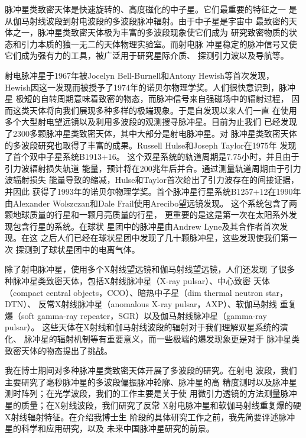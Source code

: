 

脉冲星类致密天体是快速旋转的、高度磁化的中子星。它们最重要的特征之一
是从伽马射线波段到射电波段的多波段脉冲辐射。由于中子星是宇宙中
最致密的天体之一，脉冲星类致密天体极为丰富的多波段现象使它们成为
研究致密物质的状态和引力本质的独一无二的天体物理实验室。而射电脉
冲星稳定的脉冲信号又使它们成为强有力的工具，被广泛用于研究星际介质、
探测引力波以及导航等。

射电脉冲星于1967年被Jocelyn Bell-Burnell和Antony Hewish等首次发现\supercite{hbp+68}，
Hewish因这一发现而被授予了1974年的诺贝尔物理学奖。人们很快意识到，脉冲星
极短的自转周期意味着致密的物态，而脉冲信号来自强磁场中的辐射过程，
因而这类天体将向我们展现多种多样的极端现象。于是自发现以来人们一直
在使用多个大型射电望远镜以及利用多波段的观测搜寻脉冲星。目前为止我们
已经发现了2300多颗脉冲星类致密天体，其中大部分是射电脉冲星。对
脉冲星类致密天体的多波段研究也取得了丰富的成果。Russell Hulse和Joseph Taylor在1975年
发现了首个双中子星系统B1913$+$16\supercite{ht75}。
这个双星系统的轨道周期是7.75小时，并且由于引力波辐射损失轨道
能量，预计将在200兆年后并合。通过测量轨道周期由于引力波辐射损失
能量导致的缩减，Hulse和Taylor首次给出了引力波存在的间接证据，并因此
获得了1993年的诺贝尔物理学奖。首个脉冲星行星系统B1257$+$12在1990年
由Alexander Wolszczan和Dale Frail使用Arecibo望远镜发现\supercite{wf92}。
这个系统包含了两颗地球质量的行星和一颗月亮质量的行星\supercite{wol94}，
更重要的是这是第一次在太阳系外发现包含行星的系统。在球状
星团中的脉冲星由Andrew Lyne及其合作者首次发现\supercite{lbm+87}。在这
之后人们已经在球状星团中发现了几十颗脉冲星，这些发现使我们第一次
探测到了球状星团中的电离气体\supercite{fkl+01}。

除了射电脉冲星，使用多个X射线望远镜和伽马射线望远镜，人们还发现
了很多种脉冲星类致密天体，包括X射线脉冲星（X-ray pulsar）、中心致密
天体（compact central objects，CCO）、暗热中子星（dim thermal neutron star，DTN）、
反常X射线脉冲星（anomalous X-ray pulsar，AXP）、软伽马射线
重复爆（soft gamma-ray repeater，SGR）以及伽马射线脉冲星（gamma-ray pulsar）。
这些天体在X射线和伽马射线波段的辐射对于我们理解双星系统的演化、
脉冲星的辐射机制等有重要意义，而一些极端的爆发现象更是对于
脉冲星类致密天体的物态提出了挑战\supercite{m08}。

我在博士期间对多种脉冲星类致密天体开展了多波段的研究。在射电
波段，我们主要研究了毫秒脉冲星的多波段偏振脉冲轮廓、脉冲星的高
精度测时以及脉冲星测时阵列；在光学波段，我们的工作主要是关于使
用微引力透镜的方法测量脉冲星的质量；在X射线波段，我们研究了反常
X射电脉冲星和软伽马射线重复爆的硬X射线辐射特征。在介绍我博士生
阶段的具体研究工作之前，我先简要评述脉冲星的科学和应用研究，以及
未来中国脉冲星研究的前景。

